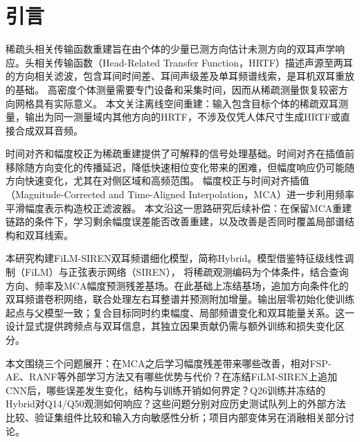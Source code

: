 \section{引言}
\label{sec:introduction}

稀疏头相关传输函数重建旨在由个体的少量已测方向估计未测方向的双耳声学响应。头相关传输函数（Head-Related Transfer Function，HRTF）描述声源至两耳的方向相关滤波，包含耳间时间差、耳间声级差及单耳频谱线索，是耳机双耳重放的基础\cite{R6}。%
高密度个体测量需要专门设备和采集时间，因而从稀疏测量恢复较密方向网格具有实际意义\cite{R13}。%
本文关注离线空间重建：输入包含目标个体的稀疏双耳测量，输出为同一测量域内其他方向的HRTF，不涉及仅凭人体尺寸生成HRTF或直接合成双耳音频。

时间对齐和幅度校正为稀疏重建提供了可解释的信号处理基础。时间对齐在插值前移除随方向变化的传播延迟，降低快速相位变化带来的困难，但幅度响应仍可能随方向快速变化，尤其在对侧区域和高频范围\cite{R1,R3}。%
幅度校正与时间对齐插值（Magnitude-Corrected and Time-Aligned Interpolation，MCA）进一步利用频率平滑幅度表示构造校正滤波器\cite{R1}。%
本文沿这一思路研究后续补偿：在保留MCA重建链路的条件下，学习剩余幅度误差能否改善重建，以及改善是否同时覆盖局部谱结构和双耳线索。

本研究构建FiLM-SIREN双耳频谱细化模型，简称Hybrid。模型借鉴特征级线性调制（FiLM）\cite{R7}与正弦表示网络（SIREN）\cite{R11}，%
将稀疏观测编码为个体条件，结合查询方向、频率及MCA幅度预测残差基场。在此基础上冻结基场，追加方向条件化的双耳频谱卷积网络，联合处理左右耳整谱并预测附加增量。输出层零初始化使训练起点与父模型一致；复合目标同时约束幅度、局部频谱变化和双耳能量关系。这一设计显式提供跨频点与双耳信息，其独立因果贡献仍需与额外训练和损失变化区分。

本文围绕三个问题展开：在MCA之后学习幅度残差带来哪些改善，相对FSP-AE、RANF等外部学习方法又有哪些优势与代价？在冻结FiLM-SIREN上追加CNN后，哪些误差发生变化，结构与训练开销如何界定？Q26训练并冻结的Hybrid对Q14/Q50观测如何响应？这些问题分别对应历史测试队列上的外部方法比较、验证集组件比较和输入方向敏感性分析；项目内部变体另在消融相关部分讨论。

